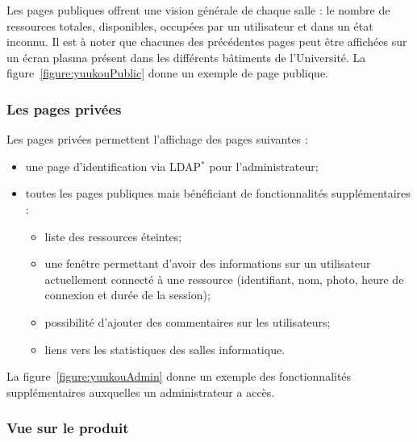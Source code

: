 \vspace{0.20cm}

Les pages publiques offrent une vision g\'en\'erale de chaque salle : le nombre de ressources totales, disponibles, occup\'ees par un utilisateur et dans un \'etat inconnu.
Il est \`a noter que chacunes des pr\'ec\'edentes pages peut \^etre affich\'ees sur un \'ecran plasma pr\'esent dans les diff\'erents b\^atiments de l'Universit\'e.
La figure~\ref{figure:yuukouPublic} donne un exemple de page publique.

\subsubsection{Les pages priv\'ees}

\noindent Les pages priv\'ees permettent l'affichage des pages suivantes :

\begin{itemize}
	\item une page d'identification via LDAP$^*$ pour l'administrateur;
	\item toutes les pages publiques mais b\'en\'eficiant de fonctionnalit\'es suppl\'ementaires :

	\begin{itemize}
		\item liste des ressources \'eteintes;
		\item une fen\^etre permettant d'avoir des informations sur un utilisateur actuellement connect\'e \`a une ressource (identifiant, nom, photo, heure de connexion et dur\'ee de la session);
		\item possibilit\'e d'ajouter des commentaires sur les utilisateurs;
		\item liens vers les statistiques des salles informatique.

	\end{itemize}

\end{itemize}

\vspace{0.20cm}

La figure~\ref{figure:yuukouAdmin} donne un exemple des fonctionnalit\'es suppl\'ementaires auxquelles un administrateur a acc\`es.

\clearpage

\subsubsection{Vue sur le produit}

